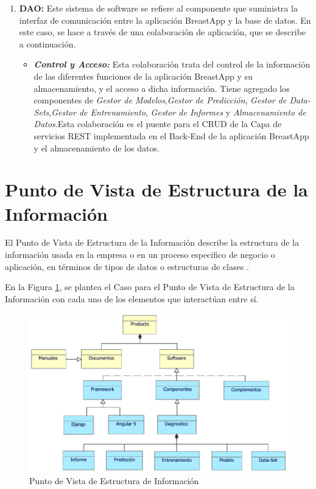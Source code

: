 \begin{enumerate}[label=\textbf{\arabic*})]
\item  \textbf{DAO:} Este sistema de software se refiere al componente que suministra la interfaz de comunicación entre la aplicación BreastApp y la base de datos. En este caso, se hace a través de una colaboración de aplicación, que se describe a continuación.

\begin{itemize}
	\item  \textbf{\textit{Control y Acceso:}} Esta colaboración trata del control de la información de las diferentes funciones de la aplicación BreastApp y su almacenamiento, y el acceso a dicha información. Tiene agregado los componentes de \textit{Gestor de Modelos},\textit{Gestor de Predicción}, \textit{Gestor de Data-Sets},\textit{Gestor de Entrenamiento}, \textit{Gestor de Informes} y \textit{Almacenamiento de Datos}.Esta colaboración es el puente para el CRUD de la Capa de servicios REST implementada en el Back-End de la aplicación BreastApp y el
	almacenamiento de los datos.
\end{itemize} 
\end{enumerate}
\newpage
\section{Punto de Vista de Estructura de la Información}
El Punto de Vista de Estructura de la Información describe la estructura de la información usada en la empresa o en un proceso especifico de negocio o aplicación, en términos de tipos de datos o estructuras de clases \cite{BolanosCastro2019}.

En la Figura \ref{PvEstructuraInfo}, se plantea el Caso para el Punto de Vista de Estructura de la Información con cada uno de los elementos que interactúan entre sí. 

\begin{figure}[h!]
   \centering
   \includegraphics[width=1\linewidth]{ARQUITECTURA/imgs/CapaTecnologia/4_PvEstructuraInformacionTec}
	\caption{Punto de Vista de Estructura de Información}
	\label{PvEstructuraInfo}
\end{figure}

